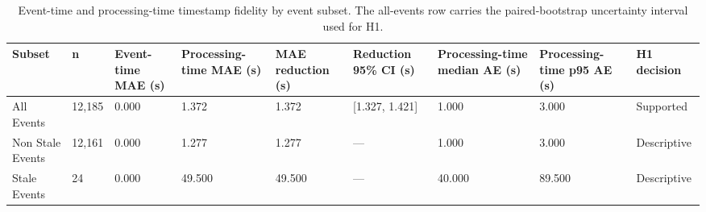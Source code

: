 \begin{table}
\caption{Event-time and processing-time timestamp fidelity by event subset. The all-events row carries the paired-bootstrap uncertainty interval used for H1.}
\label{tab:timestamp-alignment}
\begin{tabular}{lllllllll}
\toprule
Subset & n & Event-time MAE (s) & Processing-time MAE (s) & MAE reduction (s) & Reduction 95\% CI (s) & Processing-time median AE (s) & Processing-time p95 AE (s) & H1 decision \\
\midrule
All Events & 12,185 & 0.000 & 1.372 & 1.372 & [1.327, 1.421] & 1.000 & 3.000 & Supported \\
Non Stale Events & 12,161 & 0.000 & 1.277 & 1.277 & — & 1.000 & 3.000 & Descriptive \\
Stale Events & 24 & 0.000 & 49.500 & 49.500 & — & 40.000 & 89.500 & Descriptive \\
\bottomrule
\end{tabular}
\end{table}
